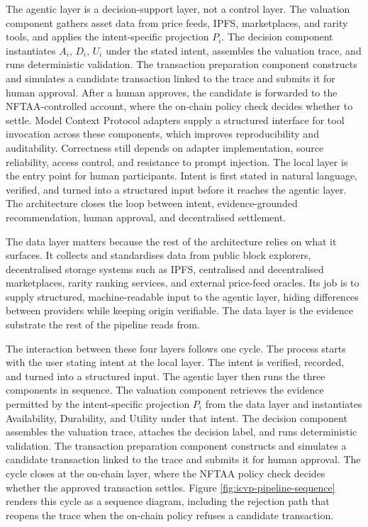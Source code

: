 The agentic layer is a decision-support layer, not a control layer. The valuation component gathers asset data from price feeds, IPFS, marketplaces, and rarity tools, and applies the intent-specific projection $P_i$. The decision component instantiates $A_i$, $D_i$, $U_i$ under the stated intent, assembles the valuation trace, and runs deterministic validation. The transaction preparation component constructs and simulates a candidate transaction linked to the trace and submits it for human approval. After a human approves, the candidate is forwarded to the NFTAA-controlled account, where the on-chain policy check decides whether to settle. Model Context Protocol adapters supply a structured interface for tool invocation across these components, which improves reproducibility and auditability. Correctness still depends on adapter implementation, source reliability, access control, and resistance to prompt injection. The local layer is the entry point for human participants. Intent is first stated in natural language, verified, and turned into a structured input before it reaches the agentic layer. The architecture closes the loop between intent, evidence-grounded recommendation, human approval, and decentralised settlement.

The data layer matters because the rest of the architecture relies on what it surfaces. It collects and standardises data from public block explorers, decentralised storage systems such as IPFS, centralised and decentralised marketplaces, rarity ranking services, and external price-feed oracles. Its job is to supply structured, machine-readable input to the agentic layer, hiding differences between providers while keeping origin verifiable. The data layer is the evidence substrate the rest of the pipeline reads from.

The interaction between these four layers follows one cycle. The process starts with the user stating intent at the local layer. The intent is verified, recorded, and turned into a structured input. The agentic layer then runs the three components in sequence. The valuation component retrieves the evidence permitted by the intent-specific projection $P_i$ from the data layer and instantiates Availability, Durability, and Utility under that intent. The decision component assembles the valuation trace, attaches the decision label, and runs deterministic validation. The transaction preparation component constructs and simulates a candidate transaction linked to the trace and submits it for human approval. The cycle closes at the on-chain layer, where the NFTAA policy check decides whether the approved transaction settles. Figure \ref{fig:icvp-pipeline-sequence} renders this cycle as a sequence diagram, including the rejection path that reopens the trace when the on-chain policy refuses a candidate transaction.


